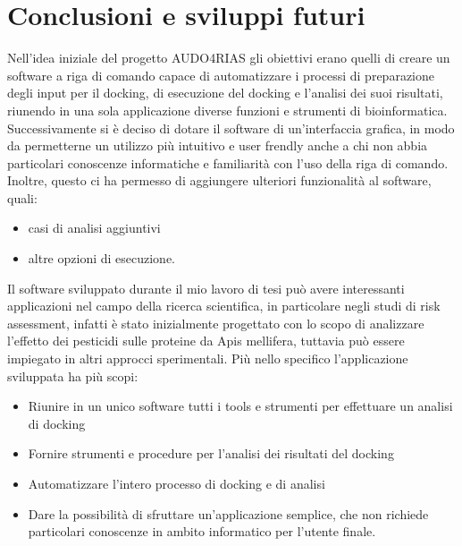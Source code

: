 \chapter*{Conclusioni e sviluppi futuri}
Nell’idea iniziale del progetto AUDO4RIAS gli obiettivi erano quelli di creare un software a riga di comando capace di automatizzare i processi di preparazione degli input per il docking, di esecuzione del docking e l’analisi dei suoi risultati, riunendo in una sola applicazione diverse funzioni e strumenti di bioinformatica. Successivamente si è deciso di dotare il software di un’interfaccia grafica, in modo da permetterne un utilizzo più intuitivo e user frendly anche a chi non abbia particolari conoscenze informatiche e familiarità con l’uso della riga di comando. Inoltre, questo ci ha permesso di aggiungere ulteriori funzionalità al software, quali:

\begin{itemize}
    \item casi di analisi aggiuntivi
    \item altre opzioni di esecuzione. 
\end{itemize}

Il software sviluppato durante il mio lavoro di tesi può avere interessanti applicazioni nel campo della ricerca scientifica, in particolare negli studi di risk assessment, infatti è stato inizialmente progettato con lo scopo di analizzare l’effetto dei pesticidi sulle proteine da Apis mellifera, tuttavia può essere impiegato in altri approcci sperimentali. Più nello specifico l’applicazione sviluppata ha più scopi: 

\begin{itemize}
    \item Riunire in un unico software tutti i tools e strumenti per effettuare un analisi di docking
    \item Fornire strumenti e procedure per l’analisi dei risultati del docking
    \item Automatizzare l’intero processo di docking e di analisi
    \item Dare la possibilità di sfruttare un’applicazione semplice, che non richiede particolari conoscenze in ambito informatico per l’utente finale.
\end{itemize}

